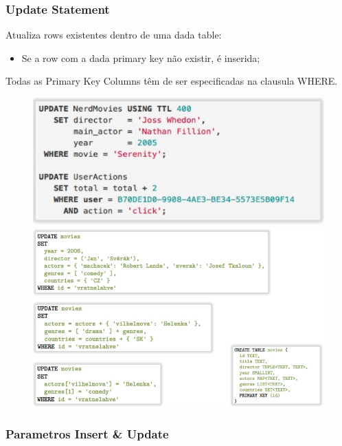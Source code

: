 \documentclass{article}
\begin{document}
\subsubsection{Update Statement}

\begin{flushleft}
  Atualiza rows existentes dentro de uma dada table:
  \begin{itemize}
    \item Se a row com a dada primary key não existir, é inserida; 
  \end{itemize}

  Todas as Primary Key Columns têm de ser especificadas na clausula WHERE.

  \begin{figure}[!h]
    \centering
    \includegraphics[scale=0.3]{37}
    \includegraphics[scale=0.3]{38}
  \end{figure}
\end{flushleft}

\pagebreak

\subsubsection{Parametros Insert \& Update}
\end{document}
